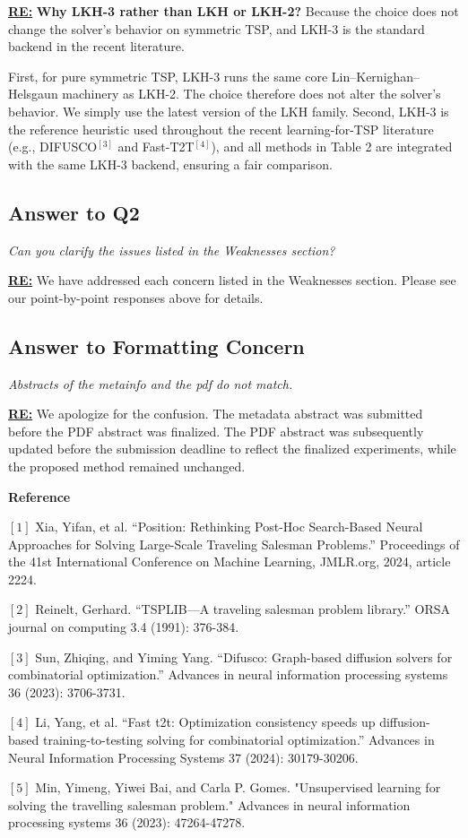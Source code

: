 \textbf{\underline{RE:}}
\textbf{Why LKH-3 rather than LKH or LKH-2?} Because the choice does not change the solver’s behavior on symmetric TSP, and LKH-3 is the standard backend in the recent literature.

First, for pure symmetric TSP, LKH-3 runs the same core Lin–Kernighan–Helsgaun machinery as LKH-2. The choice therefore does not alter the solver's behavior. We simply use the latest version of the LKH family. Second, LKH-3 is the reference heuristic used throughout the recent learning-for-TSP literature (e.g., DIFUSCO$^{[3]}$ and Fast-T2T$^{[4]}$), and all methods in Table 2 are integrated with the same LKH-3 backend, ensuring a fair comparison.

\subsection{Answer to Q2}

\textit{Can you clarify the issues listed in the Weaknesses section?}

\textbf{\underline{RE:}}
We have addressed each concern listed in the Weaknesses section. Please see our point-by-point responses above for details.


\subsection{Answer to Formatting Concern}

\textit{Abstracts of the metainfo and the pdf do not match.}

\textbf{\underline{RE:}}
We apologize for the confusion. The metadata abstract was submitted before the PDF abstract was finalized. The PDF abstract was subsequently updated before the submission deadline to reflect the finalized experiments, while the proposed method remained unchanged. 


\textbf{Reference}

$[1]$ Xia, Yifan, et al. ``Position: Rethinking Post-Hoc Search-Based Neural Approaches for Solving Large-Scale Traveling Salesman Problems.'' Proceedings of the 41st International Conference on Machine Learning, JMLR.org, 2024, article 2224.

${[2]}$ Reinelt, Gerhard. ``TSPLIB—A traveling salesman problem library.'' ORSA journal on computing 3.4 (1991): 376-384.

$[3]$ Sun, Zhiqing, and Yiming Yang. ``Difusco: Graph-based diffusion solvers for combinatorial optimization.'' Advances in neural information processing systems 36 (2023): 3706-3731.

$[4]$ Li, Yang, et al. ``Fast t2t: Optimization consistency speeds up diffusion-based training-to-testing solving for combinatorial optimization.'' Advances in Neural Information Processing Systems 37 (2024): 30179-30206.

$[5]$ Min, Yimeng, Yiwei Bai, and Carla P. Gomes. "Unsupervised learning for solving the travelling salesman problem." Advances in neural information processing systems 36 (2023): 47264-47278.